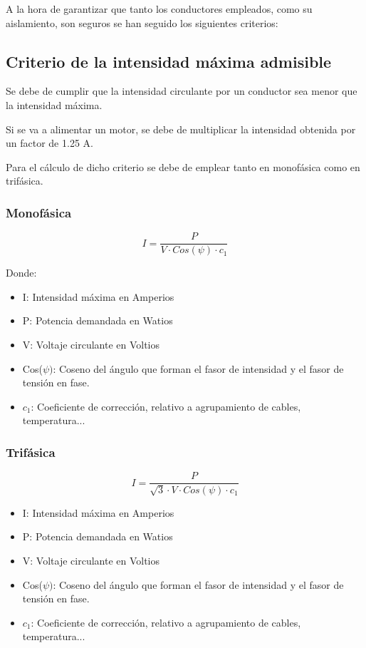 \documentclass[../main.tex]{subfiles}
\begin{document}
A la hora de garantizar que tanto los conductores empleados, como su aislamiento, son seguros se han seguido los siguientes criterios:

\subsection{Criterio de la intensidad máxima admisible}

Se debe de cumplir que la intensidad circulante por un conductor sea menor que la intensidad máxima.  

Si se va a alimentar un motor, se debe de multiplicar la intensidad obtenida por un factor de 1.25 A.

Para el cálculo de dicho criterio se debe de emplear tanto en monofásica como en trifásica.

\subsubsection{Monofásica}

\begin{equation}
    I = \frac{P}{V\cdot Cos(\psi) \cdot  c_1}
\end{equation}

Donde:

\begin{itemize}
    \item I: Intensidad máxima en Amperios
    \item P: Potencia demandada en Watios
    \item V: Voltaje circulante en Voltios
    \item Cos($\psi)$: Coseno del ángulo que forman el fasor de intensidad y el fasor de tensión en fase.
    \item $c_1$: Coeficiente de corrección, relativo a agrupamiento de cables, temperatura...
\end{itemize}

\subsubsection{Trifásica}

\begin{equation}
    I = \frac{P}{\sqrt{3}\cdot V\cdot Cos(\psi) \cdot c_1}
\end{equation}

\begin{itemize}
    \item I: Intensidad máxima en Amperios
    \item P: Potencia demandada en Watios
    \item V: Voltaje circulante en Voltios
    \item Cos($\psi)$: Coseno del ángulo que forman el fasor de intensidad y el fasor de tensión en fase.
    \item $c_1$: Coeficiente de corrección, relativo a agrupamiento de cables, temperatura...
\end{itemize}
\end{document}
